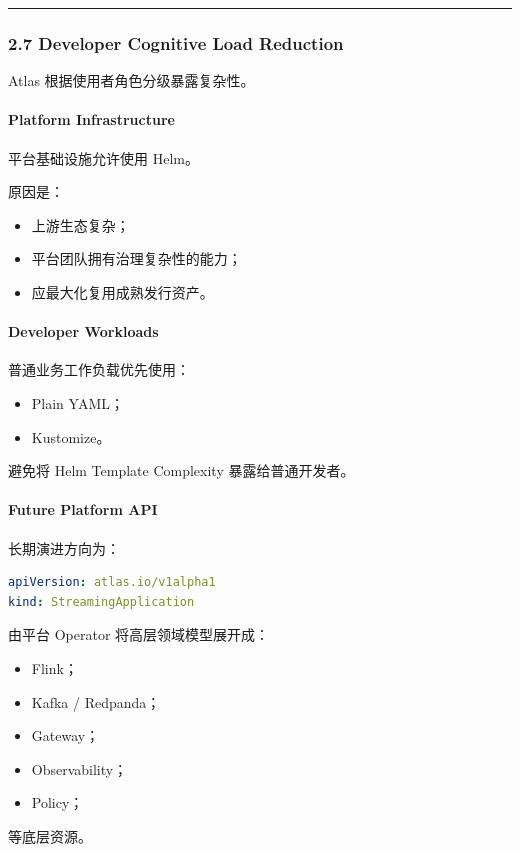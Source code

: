 \documentclass[11pt,a4paper]{article}
\begin{document}
\vspace{0.5em}\hrule\vspace{0.5em}
\subsubsection{2.7 Developer Cognitive Load Reduction}
Atlas 根据使用者角色分级暴露复杂性。

\paragraph{Platform Infrastructure}
平台基础设施允许使用 Helm。

原因是：

\begin{itemize}
  \item 上游生态复杂；
  \item 平台团队拥有治理复杂性的能力；
  \item 应最大化复用成熟发行资产。
\end{itemize}
\paragraph{Developer Workloads}
普通业务工作负载优先使用：

\begin{itemize}
  \item Plain YAML；
  \item Kustomize。
\end{itemize}
避免将 Helm Template Complexity 暴露给普通开发者。

\paragraph{Future Platform API}
长期演进方向为：

\begin{lstlisting}[language=yaml]
apiVersion: atlas.io/v1alpha1
kind: StreamingApplication
\end{lstlisting}
由平台 Operator 将高层领域模型展开成：

\begin{itemize}
  \item Flink；
  \item Kafka / Redpanda；
  \item Gateway；
  \item Observability；
  \item Policy；
\end{itemize}
等底层资源。
\end{document}
